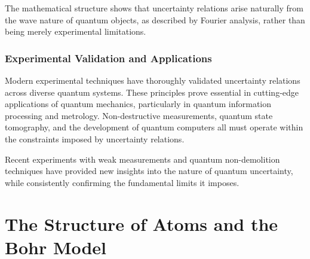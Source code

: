 \documentclass[
  a4paper,
]{book}
\begin{document}
\begin{tcolorbox}[enhanced jigsaw, coltitle=black, title=\textcolor{quarto-callout-important-color}{\faExclamation}\hspace{0.5em}{Important}, colframe=quarto-callout-important-color-frame, toprule=.15mm, opacitybacktitle=0.6, left=2mm, opacityback=0, breakable, toptitle=1mm, bottomtitle=1mm, leftrule=.75mm, arc=.35mm, titlerule=0mm, colbacktitle=quarto-callout-important-color!10!white, rightrule=.15mm, bottomrule=.15mm, colback=white]

The mathematical structure shows that uncertainty relations arise
naturally from the wave nature of quantum objects, as described by
Fourier analysis, rather than being merely experimental limitations.

\end{tcolorbox}

\subsection{Experimental Validation and
Applications}\label{experimental-validation-and-applications}

Modern experimental techniques have thoroughly validated uncertainty
relations across diverse quantum systems. These principles prove
essential in cutting-edge applications of quantum mechanics,
particularly in quantum information processing and metrology.
Non-destructive measurements, quantum state tomography, and the
development of quantum computers all must operate within the constraints
imposed by uncertainty relations.

\begin{tcolorbox}[enhanced jigsaw, coltitle=black, title=\textcolor{quarto-callout-note-color}{\faInfo}\hspace{0.5em}{Note}, colframe=quarto-callout-note-color-frame, toprule=.15mm, opacitybacktitle=0.6, left=2mm, opacityback=0, breakable, toptitle=1mm, bottomtitle=1mm, leftrule=.75mm, arc=.35mm, titlerule=0mm, colbacktitle=quarto-callout-note-color!10!white, rightrule=.15mm, bottomrule=.15mm, colback=white]

Recent experiments with weak measurements and quantum non-demolition
techniques have provided new insights into the nature of quantum
uncertainty, while consistently confirming the fundamental limits it
imposes.

\end{tcolorbox}

\chapter{The Structure of Atoms and the Bohr
Model}\label{the-structure-of-atoms-and-the-bohr-model}
\end{document}
